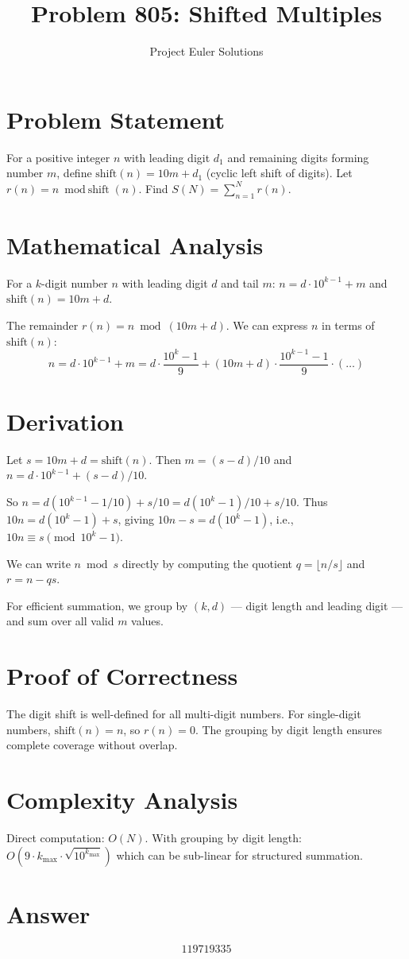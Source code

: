 \documentclass[11pt]{article}
\title{Problem 805: Shifted Multiples}
\author{Project Euler Solutions}
\date{}
\begin{document}
\maketitle

\section{Problem Statement}
For a positive integer $n$ with leading digit $d_1$ and remaining digits forming number $m$, define $\text{shift}(n) = 10m + d_1$ (cyclic left shift of digits). Let $r(n) = n \bmod \text{shift}(n)$. Find $S(N) = \sum_{n=1}^{N} r(n)$.

\section{Mathematical Analysis}
For a $k$-digit number $n$ with leading digit $d$ and tail $m$: $n = d \cdot 10^{k-1} + m$ and $\text{shift}(n) = 10m + d$.

The remainder $r(n) = n \bmod (10m+d)$. We can express $n$ in terms of $\text{shift}(n)$:
$$n = d \cdot 10^{k-1} + m = d \cdot \frac{10^k - 1}{9} + (10m+d) \cdot \frac{10^{k-1}-1}{9} \cdot (\ldots)$$

\section{Derivation}
Let $s = 10m + d = \text{shift}(n)$. Then $m = (s - d)/10$ and $n = d \cdot 10^{k-1} + (s-d)/10$.

So $n = d(10^{k-1} - 1/10) + s/10 = d(10^k - 1)/10 + s/10$.
Thus $10n = d(10^k - 1) + s$, giving $10n - s = d(10^k - 1)$, i.e., $10n \equiv s \pmod{10^k - 1}$.

We can write $n \bmod s$ directly by computing the quotient $q = \lfloor n/s \rfloor$ and $r = n - qs$.

For efficient summation, we group by $(k, d)$ --- digit length and leading digit --- and sum over all valid $m$ values.

\section{Proof of Correctness}
The digit shift is well-defined for all multi-digit numbers. For single-digit numbers, $\text{shift}(n) = n$, so $r(n) = 0$. The grouping by digit length ensures complete coverage without overlap.

\section{Complexity Analysis}
Direct computation: $O(N)$. With grouping by digit length: $O(9 \cdot k_{\max} \cdot \sqrt{10^{k_{\max}}})$ which can be sub-linear for structured summation.

\section{Answer}

\[
\boxed{119719335}
\]
\end{document}
